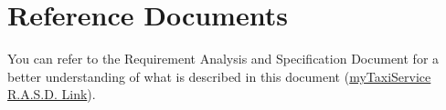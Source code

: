 \documentclass[../../../../dd.tex]{subfiles}
\begin{document}
	\section{Reference Documents}
		You can refer to the Requirement Analysis and Specification Document for a better understanding of what is described in this document (\href{https://github.com/SimoneDeola/CremonaDeola/blob/master/Deliveries/rasd.pdf}{myTaxiService R.A.S.D. Link}).
\end{document}

